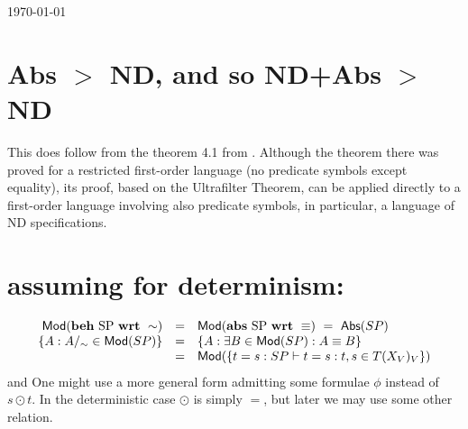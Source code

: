 \documentclass[10pt]{article}
\newcommand{\abs}[2]{{\rm \bf abs}\ \mbox{#1}\ {\rm \bf wrt}\ #2}
\newcommand{\beh}[2]{{\rm \bf beh}\ \mbox{#1}\ {\rm \bf wrt}\ #2}
\newcommand{\Abs}[1]{\mbox{\sf Abs}(#1)}
\newcommand{\support}{This research was supported by the Polish
Research Committee and by the Norwegian Research Council.}
\begin{document}
 



\today 

%
%

\section{Abs $>$ ND, and so ND+Abs $>$ ND}
This does follow from the theorem 4.1 from \cite{behImpos}. Although
the theorem there was proved for a restricted first-order language (no
predicate symbols except equality), its proof, based on the
Ultrafilter Theorem, can be applied directly to a first-order language involving
also predicate symbols, in particular, a language of ND specifications.

\section{assuming for determinism:}
\[\begin{array}{rcl}
\SMod(\beh{SP}\sim) & = & \SMod(\abs{SP}\equiv)\ =\ \Abs {SP}\\
 \{A: A/_\sim\in\SMod(SP)\}  & = & \{A: \exists B\in\SMod(SP): A\equiv
B\} \\
 & = & \SMod(\{t=s:SP\vdash t=s:
t,s\in T(X_{V})_V\})
\end{array}
\]
and 
One might use a more general form admitting some formulae $\phi$ instead of
$s\odot t$. In the deterministic case $\odot$ is simply $=$, but later we
may use some other relation.
\end{document}
